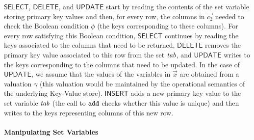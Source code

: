 $\mathsf{SELECT}$, $\mathsf{DELETE}$, and $\mathsf{UPDATE}$ start by reading the contents of the set variable storing primary key values and then, for every row, the columns in $\vec{c_2}$ needed to check the Boolean condition $\phi$ (the keys corresponding to these columns). For every row satisfying this Boolean condition, $\mathsf{SELECT}$ continues by reading the keys associated to the columns that need to be returned, $\mathsf{DELETE}$ removes the primary key value associated to this row from the set $\mathit{tab}$, and $\mathsf{UPDATE}$ writes to the keys corresponding to the columns that need to be updated. In the case of $\mathsf{UPDATE}$, we assume that the values of the variables in $\vec{x}$ are obtained from a valuation $\gamma$ (this valuation would be maintained by the operational semantics of the underlying Key-Value store). $\mathsf{INSERT}$ adds a new primary key value to the set variable $\mathit{tab}$ (the call to $\mathtt{add}$ checks whether this value is unique) and then writes to the keys representing columns of this new row.



\paragraph{Manipulating Set Variables}

